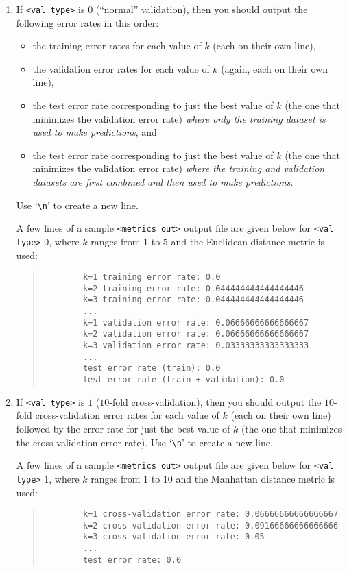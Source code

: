 \documentclass[11pt,addpoints,answers]{exam}
\begin{document}
\begin{enumerate}
    \item If \lstinline{<val type>} is $0$ (``normal'' validation), then you should output the following error rates in this order: 
    \begin{itemize}
        \item the training error rates for each value of $k$ (each on their own line),
        \item the validation error rates for each value of $k$ 
        (again, each on their own line),
        \item the test error rate corresponding to just the best value of $k$ (the one that minimizes the validation error rate) \emph{where only the training dataset is used to make predictions}, and 
        \item the test error rate corresponding to just the best value of $k$ (the one that minimizes the validation error rate) \emph{where the training and validation datasets are first combined and then used to make predictions}.
    \end{itemize} 
    Use `\texttt{\textbackslash n}' to create a new line.
    
    A few lines of a sample \lstinline{<metrics out>} output file are given below for \lstinline{<val type>} $0$, where $k$ ranges from $1$ to $5$ and the Euclidean distance metric is used:
    \begin{quote}
    \begin{verbatim}
        k=1 training error rate: 0.0
        k=2 training error rate: 0.044444444444444446
        k=3 training error rate: 0.044444444444444446
        ...
        k=1 validation error rate: 0.06666666666666667
        k=2 validation error rate: 0.06666666666666667
        k=3 validation error rate: 0.03333333333333333
        ...
        test error rate (train): 0.0
        test error rate (train + validation): 0.0
    \end{verbatim}
    \end{quote}
    
    \item If \lstinline{<val type>} is $1$ ($10$-fold cross-validation), then you should output the $10$-fold cross-validation error rates for each value of $k$ (each on their own line) followed by the error rate for just the best value of $k$ (the one that minimizes the cross-validation error rate). Use `\texttt{\textbackslash n}' to create a new line.

    A few lines of a sample \lstinline{<metrics out>} output file are given below for \lstinline{<val type>} $1$, where $k$ ranges from $1$ to $10$ and the Manhattan distance metric is used:
    \begin{quote}
    \begin{verbatim}
        k=1 cross-validation error rate: 0.06666666666666667
        k=2 cross-validation error rate: 0.09166666666666666
        k=3 cross-validation error rate: 0.05
        ...
        test error rate: 0.0
    \end{verbatim}
    \end{quote}
\end{enumerate}
\end{document}
